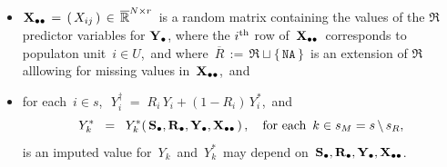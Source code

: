\begin{itemize}
\begin{itemize}
    \item
        $\mathbf{X}_{\bullet\bullet} \,=\, \left(\,X_{ij}\,\right) \,\in\, \overline{\mathbb{R}}^{N \times r}$\,
        is a random matrix containing the values of the $\Re$predictor variables for $\mathbf{Y}_{\bullet}$,
        where the $i^{\textnormal{th}}$ row of \,$\mathbf{X}_{\bullet\bullet}$\, corresponds to populaton unit \,$i \in U$,\,
        and where \,$\overline{R} \,:=\, \Re \sqcup \{\,\texttt{NA}\,\}$\,
        is an extension of $\Re$ alllowing for missing values in \,$\mathbf{X}_{\bullet\bullet}$,\, and
    \item
        for each \,$i \in s$,\,
        \,$Y^{\dagger}_{i} \;=\; R_{i}\,Y_{i}+(1-R_{i})\,Y^{*}_{i}$,\,
        and
        \begin{equation*}
        Y^{*}_{k}
        \;\; = \;\;
            Y^{*}_{k}(\,\mathbf{S}_{\bullet},\mathbf{R}_{\bullet},\mathbf{Y}_{\bullet},\mathbf{X}_{\bullet\bullet}\,)\,,
        \quad
        \textnormal{for each \,$k \in s_{M} = s\,\backslash\,s_{R}$},
        \end{equation*}
        is an imputed value for
        \,$Y_{k}$\, and \,$Y^{*}_{k}$\,
        may depend on
        \,$\mathbf{S}_{\bullet},\mathbf{R}_{\bullet},\mathbf{Y}_{\bullet},\mathbf{X}_{\bullet\bullet}$.\,
    \end{itemize}

\end{itemize}
